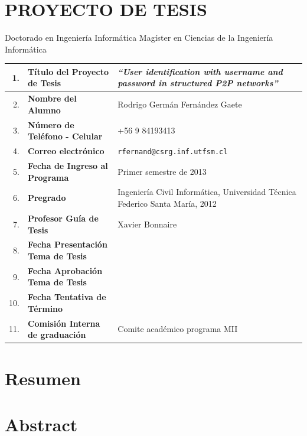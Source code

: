 \documentclass[12pt,spanish]{article}
\makeatletter
\newcommand{\tnhl}{\tabularnewline\hline}
\newcommand{\nl}{\newline}
\newcommand{\thesis}{\emph{``User identification with username and password in structured P2P networks''}}
\newcommand{\name}{Rodrigo Germán Fernández Gaete}
\newcommand{\tel}{+56 9 84193413}
\newcommand{\email}{\texttt{rfernand@csrg.inf.utfsm.cl}}
\newcommand{\idate}{Primer semestre de 2013}
\newcommand{\prof}{Xavier Bonnaire}
\newcommand{\degree}{Ingeniería Civil Informática,
                     Universidad Técnica Federico Santa María, 2012}
\newcommand{\pdate}{}
\newcommand{\adate}{}
\newcommand{\tdate}{}
\newcommand{\comi}{Comite académico programa MII}
\makeatother
\begin{document}
\section*{PROYECTO DE TESIS}
{\huge \Square} Doctorado en Ingeniería Informática
\nl\nl\noindent
{\huge \XBox} Magíster en Ciencias de la Ingeniería Informática

\begin{center}
\begin{tabular}{|r p{}|p{}|}
\hline
  1. & {\bf Título del Proyecto de Tesis    }  & \thesis  \tnhl
  2. & {\bf Nombre del Alumno               }  & \name    \tnhl
  3. & {\bf Número de Teléfono - Celular    }  & \tel     \tnhl
  4. & {\bf Correo electrónico              }  & \email   \tnhl
  5. & {\bf Fecha de Ingreso al Programa    }  & \idate   \tnhl
  6. & {\bf Pregrado                        }  & \degree  \tnhl
  7. & {\bf Profesor Guía de Tesis          }  & \prof    \tnhl
  8. & {\bf Fecha Presentación Tema de Tesis}  & \pdate   \tnhl
  9. & {\bf Fecha Aprobación Tema de Tesis  }  & \adate   \tnhl
 10. & {\bf Fecha Tentativa de Término      }  & \tdate   \tnhl
 11. & {\bf Comisión Interna de graduación  }  & \comi    \tnhl
\end{tabular}
\end{center}
\vfill
\section{Resumen}

\vfill
\section*{Abstract}
\end{document}
